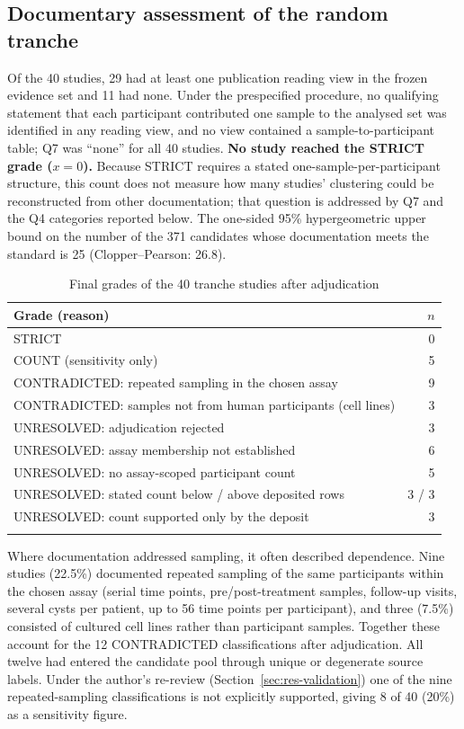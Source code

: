 \subsection{Documentary assessment of the random tranche}\label{sec:res-t1}

Of the 40 studies, 29 had at least one publication reading view in the frozen evidence set and 11 had none. Under
the prespecified procedure, no qualifying statement that each participant contributed one sample to the analysed set
was identified in any reading view, and no view contained a sample-to-participant table; Q7 was ``none'' for all 40
studies. \textbf{No study reached the STRICT grade ($x = 0$).} Because STRICT requires a stated one-sample-per-participant
structure, this count does not measure how many studies' clustering could be reconstructed from other documentation;
that question is addressed by Q7 and the Q4 categories reported below. The one-sided 95\% hypergeometric upper bound on the
number of the 371 candidates whose documentation meets the standard is 25 (Clopper--Pearson: 26.8).

\begin{table}[h]
\caption{Final grades of the 40 tranche studies after adjudication}\label{tab:t1}
\begin{tabular*}{\textwidth}{@{\extracolsep\fill}lr}
\toprule
Grade (reason) & $n$ \\
\midrule
STRICT & 0 \\
COUNT (sensitivity only) & 5 \\
CONTRADICTED: repeated sampling in the chosen assay & 9 \\
CONTRADICTED: samples not from human participants (cell lines) & 3 \\
UNRESOLVED: adjudication rejected & 3 \\
UNRESOLVED: assay membership not established & 6 \\
UNRESOLVED: no assay-scoped participant count & 5 \\
UNRESOLVED: stated count below / above deposited rows & 3 / 3 \\
UNRESOLVED: count supported only by the deposit & 3 \\
\botrule
\end{tabular*}
\end{table}

Where documentation addressed sampling, it often described dependence. Nine studies (22.5\%) documented repeated
sampling of the same participants within the chosen assay (serial time points, pre/post-treatment samples, follow-up
visits, several cysts per patient, up to 56 time points per participant), and three (7.5\%) consisted of cultured cell
lines rather than participant samples. Together these account for the 12 CONTRADICTED classifications after
adjudication. All twelve had entered the candidate pool through unique or degenerate source
labels. Under the author's re-review (Section~\ref{sec:res-validation}) one of the nine repeated-sampling classifications is not explicitly supported, giving 8 of 40 (20\%) as a sensitivity figure.

